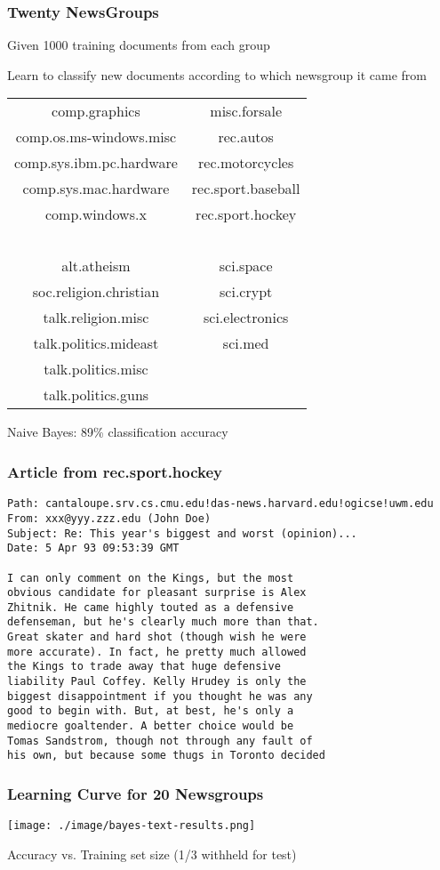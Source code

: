 \documentclass{beamer}
\begin{document}
\begin{frame}
\frametitle{Twenty NewsGroups}
\label{sec-9-7}


\small

Given 1000 training documents from each group

Learn to classify new documents according to which newsgroup it came from

\bigskip
\begin{center}
\begin{tabular}{cc}
comp.graphics & misc.forsale\\
comp.os.ms-windows.misc & rec.autos \\
comp.sys.ibm.pc.hardware & rec.motorcycles \\
comp.sys.mac.hardware & rec.sport.baseball \\
comp.windows.x & rec.sport.hockey \\
\ & \ \\
alt.atheism & sci.space \\
soc.religion.christian  & sci.crypt\\
talk.religion.misc & sci.electronics\\
talk.politics.mideast & sci.med \\
talk.politics.misc & \ \\
talk.politics.guns & \ \\
\end{tabular}
\end{center}


Naive Bayes: 89\% classification accuracy
\end{frame}
\begin{frame}[fragile]
\frametitle{Article from rec.sport.hockey}
\label{sec-9-8}

\small

\begin{verbatim}
Path: cantaloupe.srv.cs.cmu.edu!das-news.harvard.edu!ogicse!uwm.edu
From: xxx@yyy.zzz.edu (John Doe)
Subject: Re: This year's biggest and worst (opinion)...
Date: 5 Apr 93 09:53:39 GMT

I can only comment on the Kings, but the most 
obvious candidate for pleasant surprise is Alex
Zhitnik. He came highly touted as a defensive 
defenseman, but he's clearly much more than that. 
Great skater and hard shot (though wish he were 
more accurate). In fact, he pretty much allowed 
the Kings to trade away that huge defensive 
liability Paul Coffey. Kelly Hrudey is only the 
biggest disappointment if you thought he was any 
good to begin with. But, at best, he's only a 
mediocre goaltender. A better choice would be 
Tomas Sandstrom, though not through any fault of 
his own, but because some thugs in Toronto decided
\end{verbatim}
\end{frame}
\begin{frame}
\frametitle{Learning Curve for 20 Newsgroups}
\label{sec-9-9}

\texttt{[image: ./image/bayes-text-results.png]}

\centerline{Accuracy vs. Training set size (1/3 withheld for test)}
\end{frame}
\end{document}
